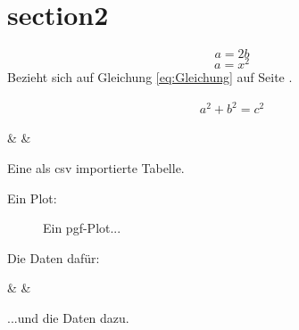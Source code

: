 \section{section2}
	\lipsum[4]
	
	\begin{equation}\label{eq:Gleichung}
		a=2b
	\end{equation}
	\begin{equation}
		a=x^2
	\end{equation}
	Bezieht sich auf Gleichung \ref{eq:Gleichung} auf Seite \pageref{eq:Gleichung}.
	
	\begin{thm}[Pythagoras]\label{thm:Pythagoras}
		\begin{gather}
			a^2 + b^2 = c^2
		\end{gather}	
	\end{thm}
	
	\begin{table}[h] %
		\centering	
		{\thecsvrow & \name & \surname}%
		\caption[CSV Import]{Eine als csv importierte Tabelle.}
		\label{tab:Tabelle1}
	\end{table}

	\lipsum[1]
	
	Ein Plot:
	\begin{figure}
		\centering
		\scalebox{.8}{}
		\caption{Ein pgf-Plot...}
		\label{fig:pgfplot}
	\end{figure}
	
	Die Daten dafür:
	\begin{table}[h] %
		\centering	
		{\thecsvrow & \x & \y}%
		\caption[Daten]{...und die Daten dazu.}
		\label{tab:pgfplot}
	\end{table}
	

%
%
%
%
%
	